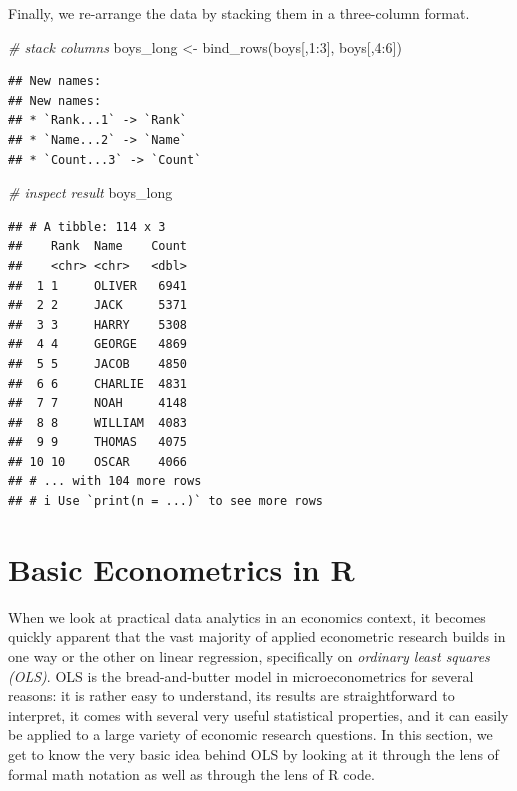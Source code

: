 \documentclass[
  12pt,
]{style/krantz}
\newenvironment{Shaded}{\begin{snugshade}}{\end{snugshade}}
\newcommand{\CommentTok}[1]{\textcolor[rgb]{0.56,0.35,0.01}{\textit{#1}}}
\newcommand{\DecValTok}[1]{\textcolor[rgb]{0.00,0.00,0.81}{#1}}
\newcommand{\FunctionTok}[1]{\textcolor[rgb]{0.00,0.00,0.00}{#1}}
\newcommand{\NormalTok}[1]{#1}
\newcommand{\OtherTok}[1]{\textcolor[rgb]{0.56,0.35,0.01}{#1}}
\newcommand{\SpecialCharTok}[1]{\textcolor[rgb]{0.00,0.00,0.00}{#1}}
\begin{document}
Finally, we re-arrange the data by stacking them in a three-column format.

\begin{Shaded}
\begin{Highlighting}[]
\CommentTok{\# stack columns}
\NormalTok{boys\_long }\OtherTok{\textless{}{-}} \FunctionTok{bind\_rows}\NormalTok{(boys[,}\DecValTok{1}\SpecialCharTok{:}\DecValTok{3}\NormalTok{], boys[,}\DecValTok{4}\SpecialCharTok{:}\DecValTok{6}\NormalTok{])}
\end{Highlighting}
\end{Shaded}

\begin{verbatim}
## New names:
## New names:
## * `Rank...1` -> `Rank`
## * `Name...2` -> `Name`
## * `Count...3` -> `Count`
\end{verbatim}

\begin{Shaded}
\begin{Highlighting}[]
\CommentTok{\# inspect result}
\NormalTok{boys\_long}
\end{Highlighting}
\end{Shaded}

\begin{verbatim}
## # A tibble: 114 x 3
##    Rank  Name    Count
##    <chr> <chr>   <dbl>
##  1 1     OLIVER   6941
##  2 2     JACK     5371
##  3 3     HARRY    5308
##  4 4     GEORGE   4869
##  5 5     JACOB    4850
##  6 6     CHARLIE  4831
##  7 7     NOAH     4148
##  8 8     WILLIAM  4083
##  9 9     THOMAS   4075
## 10 10    OSCAR    4066
## # ... with 104 more rows
## # i Use `print(n = ...)` to see more rows
\end{verbatim}

\hypertarget{basic-econometrics-in-r}{%
\chapter{Basic Econometrics in R}\label{basic-econometrics-in-r}}

When we look at practical data analytics in an economics context, it becomes quickly apparent that the vast majority of applied econometric research builds in one way or the other on linear regression, specifically on \emph{ordinary least squares (OLS)}. OLS is the bread-and-butter model in microeconometrics for several reasons: it is rather easy to understand, its results are straightforward to interpret, it comes with several very useful statistical properties, and it can easily be applied to a large variety of economic research questions. In this section, we get to know the very basic idea behind OLS by looking at it through the lens of formal math notation as well as through the lens of R code.
\end{document}
